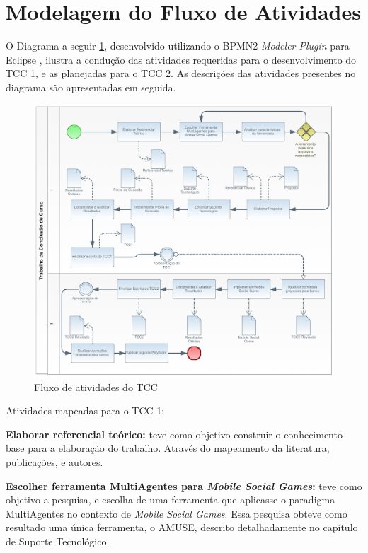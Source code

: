 \section{Modelagem do Fluxo de Atividades}
\label{sec:modelagem}

O Diagrama a seguir \ref{figura:diagram}, desenvolvido utilizando o BPMN2
\textit{Modeler Plugin} para Eclipse \cite{eclipse}, ilustra a condução das atividades
requeridas para o desenvolvimento do TCC 1, e as planejadas para o TCC 2. As
descrições das atividades presentes no diagrama são apresentadas em seguida.


\begin{figure}[H]
  \centering
  \includegraphics[width=16cm]{figuras/diagram2}
  \caption{Fluxo de atividades do TCC}
  \label{figura:diagram}
\end{figure}

Atividades mapeadas para o TCC 1:

\textbf{Elaborar referencial teórico:} teve como objetivo construir o conhecimento
base para a elaboração do trabalho. Através do mapeamento da literatura, publicações,
e autores.

\textbf{Escolher ferramenta MultiAgentes para \textit{Mobile Social Games}:} teve
como objetivo a pesquisa, e escolha de uma ferramenta que aplicasse o paradigma
MultiAgentes no contexto de \textit{Mobile Social Games}. Essa pesquisa obteve como
resultado uma única ferramenta, o AMUSE, descrito detalhadamente no capítulo de Suporte Tecnológico.

